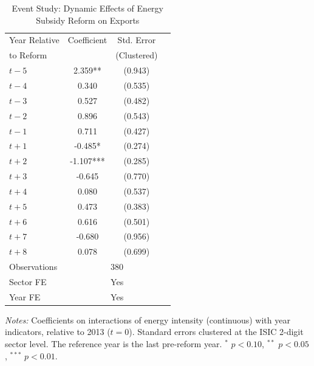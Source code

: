 \begin{table}[htbp]
\centering
\caption{Event Study: Dynamic Effects of Energy Subsidy Reform on Exports}
\label{tab:event_study}
\begin{tabular}{lccc}
\toprule
Year Relative & Coefficient & Std. Error & \\
to Reform & & (Clustered) & \\
\midrule
$t-5$ & 2.359** & (0.943) & \\
$t-4$ & 0.340 & (0.535) & \\
$t-3$ & 0.527 & (0.482) & \\
$t-2$ & 0.896 & (0.543) & \\
$t-1$ & 0.711 & (0.427) & \\
$t+1$ & -0.485* & (0.274) & \\
$t+2$ & -1.107*** & (0.285) & \\
$t+3$ & -0.645 & (0.770) & \\
$t+4$ & 0.080 & (0.537) & \\
$t+5$ & 0.473 & (0.383) & \\
$t+6$ & 0.616 & (0.501) & \\
$t+7$ & -0.680 & (0.956) & \\
$t+8$ & 0.078 & (0.699) & \\
\midrule
Observations & \multicolumn{3}{c}{380} \\
Sector FE & \multicolumn{3}{c}{Yes} \\
Year FE & \multicolumn{3}{c}{Yes} \\
\bottomrule
\end{tabular}
\begin{tablenotes}
\small
\item \textit{Notes:} Coefficients on interactions of energy intensity (continuous) with year indicators, relative to 2013 ($t=0$). Standard errors clustered at the ISIC 2-digit sector level. The reference year is the last pre-reform year. $^{*}$ $p < 0.10$, $^{**}$ $p < 0.05$, $^{***}$ $p < 0.01$.
\end{tablenotes}
\end{table}
